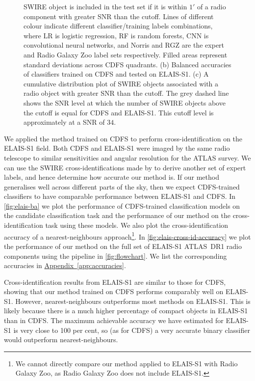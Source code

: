 \documentclass[fleqn,usenatbib,usedcolumn]{mnras}
\newcommand{\edited}[1]{#1}
\newcommand{\aref}[1]{\hyperref[#1]{Appendix~\ref{#1}}}
\begin{document}
\begin{figure}
{      SWIRE object is included in the test set if it is within $1'$ of a radio
      component with greater SNR than the cutoff. Lines of different colour
      indicate different classifier/training labels combinations, where LR is
      logistic regression, RF is random forests, CNN is convolutional neural
      networks, and Norris and RGZ are the expert and Radio Galaxy Zoo label
      sets respectively. Filled areas represent standard deviations across
      CDFS quadrants. (b) Balanced accuracies of classifiers trained on CDFS
      and tested on ELAIS-S1. (c) A cumulative distribution plot of SWIRE
      objects associated with a radio object with greater SNR than the cutoff.
      The grey dashed line shows the SNR level at which the number of SWIRE
      objects above the cutoff is equal for CDFS and ELAIS-S1. This cutoff level
      is approximately at a SNR of $34$.}
    \label{fig:accuracies-flux}
  \end{figure}

  We applied the method trained on CDFS to perform cross-identification on the
  ELAIS-S1 field. Both CDFS and ELAIS-S1 were imaged by the same radio
  telescope to similar sensitivities and angular resolution for the ATLAS
  survey. \edited{We can use the SWIRE cross-identifications made by
  \citet{middelberg08} to derive another set of expert labels, and hence
  determine how accurate our method is. If our method generalises well across
  different parts of the sky, then we expect CDFS-trained classifiers to have
  comparable performance between ELAIS-S1 and CDFS}. In \autoref{fig:elais-ba}
  we plot the performance of CDFS-trained classification models on the candidate classification task and
  the performance of our method on the cross-identification task using these models. We also plot
  the cross-identification accuracy of a nearest-neighbours approach\footnote{\edited{We cannot
  directly compare our method applied to ELAIS-S1 with Radio Galaxy Zoo, as
  Radio Galaxy Zoo does not include ELAIS-S1.}}. In
  \autoref{fig:elais-cross-id-accuracy} we plot the performance of our method
  on the full set of ELAIS-S1 ATLAS~DR1 radio components using the pipeline in
  \autoref{fig:flowchart}. We list the corresponding accuracies in
  \aref{app:accuracies}.

  Cross-identification results from ELAIS-S1 are similar to those for CDFS,
  showing that our method trained on CDFS performs comparably well on
  ELAIS-S1. However, nearest-neighbours outperforms most methods on ELAIS-S1.
  This is likely because there is a much higher percentage of compact objects
  in ELAIS-S1 than in CDFS. The maximum achievable accuracy we have estimated
  for ELAIS-S1 is very close to 100 per cent, so (as for CDFS) a very accurate
  binary classifier would outperform nearest-neighbours.
\end{document}
